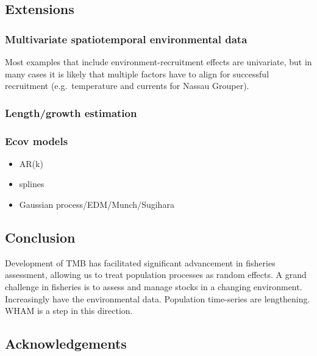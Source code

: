 \documentclass[]{article}
\providecommand{\tightlist}{%
  \setlength{\itemsep}{0pt}\setlength{\parskip}{0pt}}
\begin{document}
\hypertarget{extensions}{%
\subsection{Extensions}\label{extensions}}

\hypertarget{multivariate-spatiotemporal-environmental-data}{%
\subsubsection{Multivariate spatiotemporal environmental
data}\label{multivariate-spatiotemporal-environmental-data}}

Most examples that include environment-recruitment effects are
univariate, but in many cases it is likely that multiple factors have to
align for successful recruitment (e.g.~temperature and currents for
Nassau Grouper).

\hypertarget{lengthgrowth-estimation}{%
\subsubsection{Length/growth estimation}\label{lengthgrowth-estimation}}

\hypertarget{ecov-models}{%
\subsubsection{Ecov models}\label{ecov-models}}

\begin{itemize}
\tightlist
\item
  AR(k)
\item
  splines
\item
  Gaussian process/EDM/Munch/Sugihara
\end{itemize}

\hypertarget{conclusion}{%
\subsection{Conclusion}\label{conclusion}}

Development of TMB has facilitated significant advancement in fisheries
assessment, allowing us to treat population processes as random effects.
A grand challenge in fisheries is to assess and manage stocks in a
changing environment. Increasingly have the environmental data.
Population time-series are lengthening. WHAM is a step in this
direction.

\hypertarget{acknowledgements}{%
\subsection*{Acknowledgements}\label{acknowledgements}}
\end{document}
